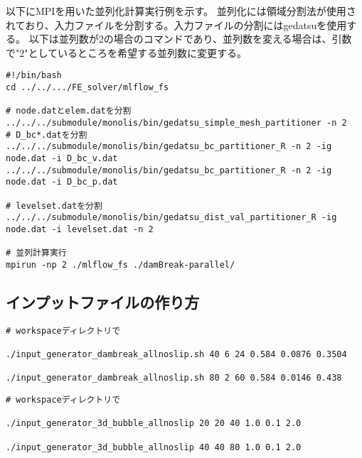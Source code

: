 以下にMPIを用いた並列化計算実行例を示す。
並列化には領域分割法が使用されており、入力ファイルを分割する。入力ファイルの分割にはgedatsuを使用する。
以下は並列数が2の場合のコマンドであり、並列数を変える場合は、引数で"2"としているところを希望する並列数に変更する。

\begin{lstlisting}[]
#!/bin/bash
cd ../../.../FE_solver/mlflow_fs

# node.datとelem.datを分割
../../../submodule/monolis/bin/gedatsu_simple_mesh_partitioner -n 2
# D_bc*.datを分割
../../../submodule/monolis/bin/gedatsu_bc_partitioner_R -n 2 -ig node.dat -i D_bc_v.dat
../../../submodule/monolis/bin/gedatsu_bc_partitioner_R -n 2 -ig node.dat -i D_bc_p.dat

# levelset.datを分割
../../../submodule/monolis/bin/gedatsu_dist_val_partitioner_R -ig node.dat -i levelset.dat -n 2

# 並列計算実行
mpirun -np 2 ./mlflow_fs ./damBreak-parallel/

\end{lstlisting}

\subsection{インプットファイルの作り方}

\begin{lstlisting}[]
# workspaceディレクトリで

./input_generator_dambreak_allnoslip.sh 40 6 24 0.584 0.0876 0.3504

./input_generator_dambreak_allnoslip.sh 80 2 60 0.584 0.0146 0.438

\end{lstlisting}

\begin{lstlisting}[]
# workspaceディレクトリで

./input_generator_3d_bubble_allnoslip 20 20 40 1.0 0.1 2.0

./input_generator_3d_bubble_allnoslip 40 40 80 1.0 0.1 2.0

\end{lstlisting}